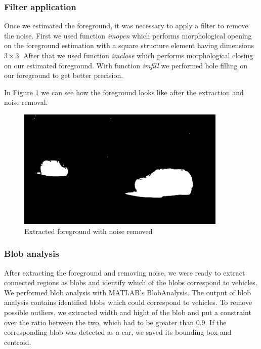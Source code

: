 \documentclass[12pt]{article} %
\begin{document}
\subsubsection{Filter application}

Once we estimated the foreground, it was necessary to apply a filter to remove the noise. First we used function \textit{imopen} which performs morphological opening on the foreground estimation with a square structure element having dimensions $3\times3$. After that we used function \textit{imclose} which performs morphological closing on our estimated foreground. With function \textit{imfill} we performed hole filling on our foreground to get better precision.

In Figure \ref{fig:extr-fg} we can see how the foreground looks like after the extraction and noise removal.

\begin{figure}[ht]
\centering
\includegraphics[width=10cm]{images/foreground.png}
\caption{Extracted foreground with noise removed}
\label{fig:extr-fg}
\end{figure}

\subsubsection{Blob analysis}

After extracting the foreground and removing noise, we were ready to extract connected regions as blobs and identify which of the blobs correspond to vehicles. We performed blob analysis with MATLAB's BlobAnalysis. The output of blob analysis contains identified blobs which could correspond to vehicles. To remove possible outliers, we extracted width and hight of the blob and put a constraint over the ratio between the two, which had to be greater than 0.9. If the corresponding blob was detected as a car, we saved its bounding box and centroid.
\end{document}
